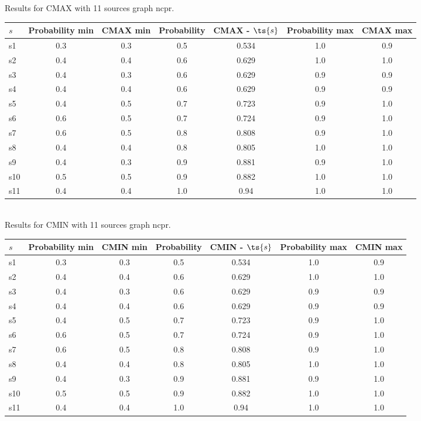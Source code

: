 \documentclass{article}
\begin{document}
\noindent Results for CMAX with 11 sources graph ncpr.

\noindent\begin{tabular}{|l|c|c|c|c|c|c|}
\hline
$s$& Probability min & CMAX min & Probability & CMAX - $\ts{s}$ & Probability max & CMAX max\\
\hline
s1 &0.3 & 0.3 & 0.5 & 0.534 & 1.0 & 0.9\\
\hline
s2 &0.4 & 0.4 & 0.6 & 0.629 & 1.0 & 1.0\\
\hline
s3 &0.4 & 0.3 & 0.6 & 0.629 & 0.9 & 0.9\\
\hline
s4 &0.4 & 0.4 & 0.6 & 0.629 & 0.9 & 0.9\\
\hline
s5 &0.4 & 0.5 & 0.7 & 0.723 & 0.9 & 1.0\\
\hline
s6 &0.6 & 0.5 & 0.7 & 0.724 & 0.9 & 1.0\\
\hline
s7 &0.6 & 0.5 & 0.8 & 0.808 & 0.9 & 1.0\\
\hline
s8 &0.4 & 0.4 & 0.8 & 0.805 & 1.0 & 1.0\\
\hline
s9 &0.4 & 0.3 & 0.9 & 0.881 & 0.9 & 1.0\\
\hline
s10 &0.5 & 0.5 & 0.9 & 0.882 & 1.0 & 1.0\\
\hline
s11 &0.4 & 0.4 & 1.0 & 0.94 & 1.0 & 1.0\\
\hline
\end{tabular}\\

\noindent Results for CMIN with 11 sources graph ncpr.

\noindent\begin{tabular}{|l|c|c|c|c|c|c|}
\hline
$s$& Probability min & CMIN min & Probability & CMIN - $\ts{s}$ & Probability max & CMIN max\\
\hline
s1 &0.3 & 0.3 & 0.5 & 0.534 & 1.0 & 0.9\\
\hline
s2 &0.4 & 0.4 & 0.6 & 0.629 & 1.0 & 1.0\\
\hline
s3 &0.4 & 0.3 & 0.6 & 0.629 & 0.9 & 0.9\\
\hline
s4 &0.4 & 0.4 & 0.6 & 0.629 & 0.9 & 0.9\\
\hline
s5 &0.4 & 0.5 & 0.7 & 0.723 & 0.9 & 1.0\\
\hline
s6 &0.6 & 0.5 & 0.7 & 0.724 & 0.9 & 1.0\\
\hline
s7 &0.6 & 0.5 & 0.8 & 0.808 & 0.9 & 1.0\\
\hline
s8 &0.4 & 0.4 & 0.8 & 0.805 & 1.0 & 1.0\\
\hline
s9 &0.4 & 0.3 & 0.9 & 0.881 & 0.9 & 1.0\\
\hline
s10 &0.5 & 0.5 & 0.9 & 0.882 & 1.0 & 1.0\\
\hline
s11 &0.4 & 0.4 & 1.0 & 0.94 & 1.0 & 1.0\\
\hline
\end{tabular}\\
\end{document}
